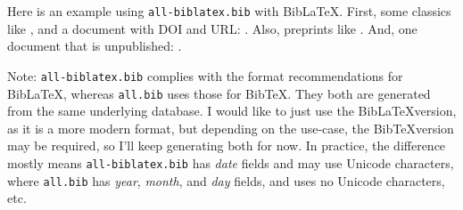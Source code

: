 \documentclass{article}
\begin{document}
Here is an example using \texttt{all-biblatex.bib} with Bib\LaTeX{}.
First, some classics like \citet{chomsky.n:1957, kolmogorov.a:1968,tesniere.l:1959, estes.w:1959}, 
and a document with DOI and URL: \citet{earley.j:1970}.
Also, preprints like
\citet{tay.y:2022,wu.m:2022,schijndel.m:2020psyarxiv}.
And, one document that is unpublished: \citet{narayanan.s:2004}.

Note: \texttt{all-biblatex.bib} complies with
the format recommendations for Bib\LaTeX, whereas \texttt{all.bib} uses those for Bib\TeX. 
They both are generated from the same underlying database.
I would like to just use the Bib\LaTeX version, as it is a more modern format, but depending on the use-case, the Bib\TeX version may be required, so I'll keep generating both for now. In practice, the difference mostly means \texttt{all-biblatex.bib} has \emph{date} fields and may use Unicode characters, where \texttt{all.bib} has \emph{year}, \emph{month}, and \emph{day} fields, and uses no Unicode characters, etc.

\printbibliography
\end{document}
